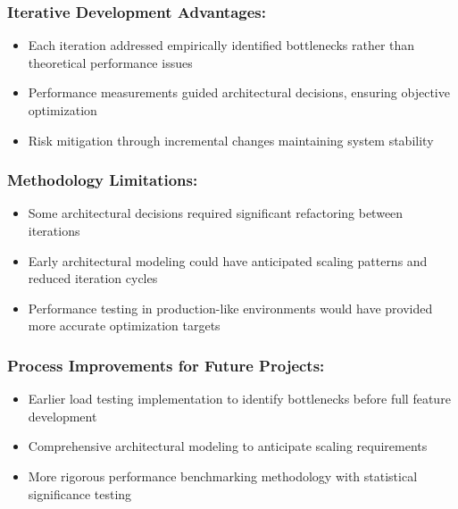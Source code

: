 \subsubsection{Iterative Development Advantages:}
\begin{itemize}
    \item Each iteration addressed empirically identified bottlenecks rather than theoretical performance issues
    \item Performance measurements guided architectural decisions, ensuring objective optimization
    \item Risk mitigation through incremental changes maintaining system stability
\end{itemize}

\subsubsection{Methodology Limitations:}
\begin{itemize}
    \item Some architectural decisions required significant refactoring between iterations
    \item Early architectural modeling could have anticipated scaling patterns and reduced iteration cycles
    \item Performance testing in production-like environments would have provided more accurate optimization targets
\end{itemize}

\subsubsection{Process Improvements for Future Projects:}
\begin{itemize}
    \item Earlier load testing implementation to identify bottlenecks before full feature development
    \item Comprehensive architectural modeling to anticipate scaling requirements
    \item More rigorous performance benchmarking methodology with statistical significance testing
\end{itemize}